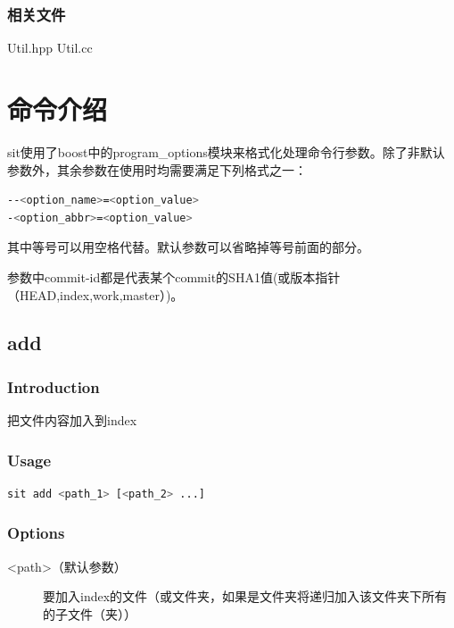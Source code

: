 \documentclass[11pt, a4paper, UTF8]{ctexart}
\begin{document}
\subsubsection{相关文件}
Util.hpp Util.cc


\section{命令介绍}
sit使用了boost中的program\_options模块来格式化处理命令行参数。除了非默认参数外，其余参数在使用时均需要满足下列格式之一：
\begin{lstlisting}[language=sh,basicstyle=\small\YaHeiMono,numbers=none]
--<option_name>=<option_value>
-<option_abbr>=<option_value>
\end{lstlisting}

其中等号可以用空格代替。默认参数可以省略掉等号前面的部分。 

参数中commit-id都是代表某个commit的SHA1值(或版本指针（HEAD,index,work,master）)。
\subsection{add}
\subsubsection{Introduction}
把文件内容加入到index
\subsubsection{Usage}
\begin{lstlisting}[language=sh,basicstyle=\small\YaHeiMono,numbers=none]
sit add <path_1> [<path_2> ...]
\end{lstlisting}
\subsubsection{Options}
\begin{description}
	\item[\YaHeiMono <path>（默认参数）] 要加入index的文件（或文件夹，如果是文件夹将递归加入该文件夹下所有的子文件（夹））
\end{description}
\end{document}
